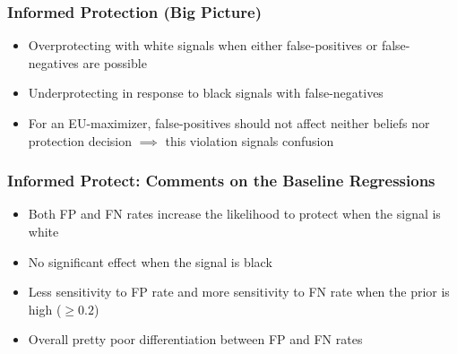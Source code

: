 \documentclass[11pt,hyperref={bookmarks=false}]{beamer}
\begin{document}
\begin{frame}
\frametitle{Informed Protection (Big Picture)}
\begin{itemize}
\item Overprotecting with white signals when either false-positives or false-negatives are possible
\item Underprotecting in response to black signals with false-negatives
\item For an EU-maximizer, false-positives should not affect neither beliefs nor protection decision $\implies$ this violation signals confusion
\end{itemize}
\scriptsize


\begin{table}[H]\centering 

\end{table}
\end{frame}


\begin{frame}
\frametitle{Informed Protect: Comments on the Baseline Regressions}
\begin{itemize}
\item Both FP and FN rates increase the likelihood to protect when the signal is white
\item No significant effect when the signal is black
\item Less sensitivity to FP rate and more sensitivity to FN rate when the prior is high ($\geq 0.2$)
\item Overall pretty poor differentiation between FP and FN rates
\end{itemize}
\end{frame}
\end{document}
